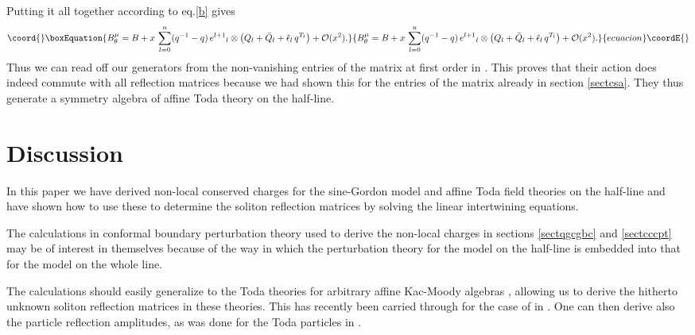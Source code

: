 \documentclass[a4paper,12pt]{article}
\numberwithin{equation}{section}
\begin{document}
Putting it all together according to eq.\eqref{b} gives
\begin{equation}\coord{}\boxEquation{
  B^\mu_\theta=B+x\,\sum_{l=0}^n(q^{-1}-q)\,e^{l+1}{}_l\otimes
  \left(Q_l+\bar{Q}_l+\hat{\epsilon}_l\,q^{T_l}\right)+{\mathcal O}(x^2).
}{
  B^\mu_\theta=B+x\,\sum_{l=0}^n(q^{-1}-q)\,e^{l+1}{}_l\otimes
  \left(Q_l+\bar{Q}_l+\hat{\epsilon}_l\,q^{T_l}\right)+{\mathcal O}(x^2).
}{ecuacion}\coordE{}\end{equation}
Thus we can read off our generators \coordHE{} from the
non-vanishing entries of the matrix \coordHE{} at first order
in \coordHE{}. This proves that their action does indeed commute with all
reflection matrices because we had shown this for the entries of
the matrix \coordHE{} already in section \ref{sectcsa}. They
thus generate a symmetry algebra of \coordHE{} affine Toda theory
on the half-line.



\section{Discussion\label{sectdis}}

In this paper we have derived non-local conserved charges for the
sine-Gordon model and \coordHE{} affine Toda field theories on
the half-line and have shown how to use these to determine the
soliton reflection matrices by solving the linear intertwining
equations.

The calculations in conformal boundary perturbation theory used to
derive the non-local charges in sections \ref{sectqgcgbc} and
\ref{sectcccpt} may be of interest in themselves because of the
way in which the perturbation theory for the model on the
half-line is embedded into that for the model on the whole line.

The calculations should easily generalize to the Toda theories for
arbitrary affine Kac-Moody algebras \coordHE{}, allowing us to
derive the hitherto unknown soliton reflection matrices in these
theories. This has recently been carried through for the case of
\coordHE{} in \cite{A}. One can then derive also the
particle reflection amplitudes, as was done for the \coordHE{}
Toda particles in \cite{Del99}.
\end{document}
